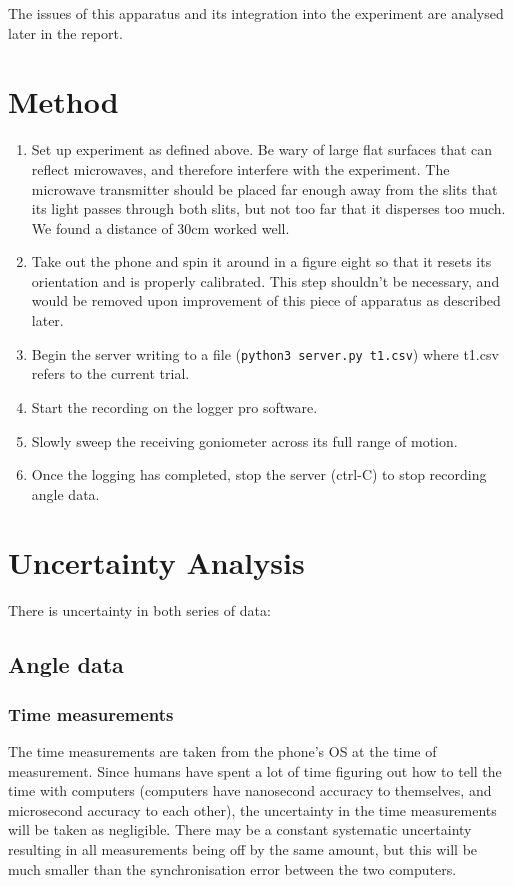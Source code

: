 The issues of this apparatus and its integration into the experiment are analysed later in the report.

\section*{Method}

\begin{enumerate}
\item Set up experiment as defined above. Be wary of large flat surfaces that can reflect microwaves, and therefore interfere with the experiment. The microwave transmitter should be placed far enough away from the slits that its light passes through both slits, but not too far that it disperses too much. We found a distance of 30cm worked well.
\item Take out the phone and spin it around in a figure eight so that it resets its orientation and is properly calibrated.
		This step shouldn't be necessary, and would be removed upon improvement of this piece of apparatus as described later.
\item Begin the server writing to a file (\verb|python3 server.py t1.csv|) where t1.csv refers to the current trial.
\item Start the recording on the logger pro software.
\item Slowly sweep the receiving goniometer across its full range of motion.
\item Once the logging has completed, stop the server (ctrl-C) to stop recording angle data.
\end{enumerate}

\section*{Uncertainty Analysis}

There is uncertainty in both series of data:

\subsection*{Angle data}

\subsubsection*{Time measurements}

The time measurements are taken from the phone's OS at the time of measurement. Since humans have spent a lot of time figuring out how to tell the time with computers (computers have nanosecond accuracy to themselves, and microsecond accuracy to each other), the uncertainty in the time measurements will be taken as negligible. There may be a constant systematic uncertainty resulting in all measurements being off by the same amount, but this will be much smaller than the synchronisation error between the two computers.

